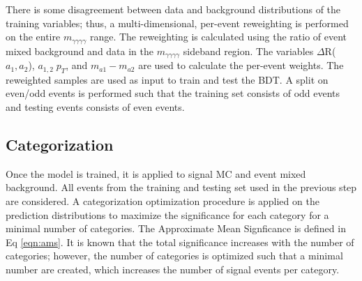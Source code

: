 \documentclass[12pt]{article}
\begin{document}


There is some disagreement between data and background distributions of the training variables; thus, a multi-dimensional, per-event reweighting is performed on the entire $m_{\gamma\gamma\gamma\gamma}$ range. The reweighting is calculated using the ratio of event mixed background and data in the $m_{\gamma\gamma\gamma\gamma}$ sideband region. The variables $\Delta$R($a_1,a_2$), $a_{1,2}\; p_T$, and $m_{a1} - m_{a2}$ are used to calculate the per-event weights. The reweighted samples are used as input to train and test the BDT. A split on even/odd events is performed such that the training set consists of odd events and testing events consists of even events.\par


\subsection{Categorization}
Once the model is trained, it is applied to signal MC and event mixed background. All events from the training and testing set used in the previous step are considered. A categorization optimization procedure is applied on the prediction distributions to maximize the significance for each category for a minimal number of categories. The Approximate Mean Signficance is defined in Eq \ref{eqn:ams}. It is known that the total significance increases with the number of categories; however, the number of categories is optimized such that a minimal number are created, which increases the number of signal events per category.\par
\end{document}
